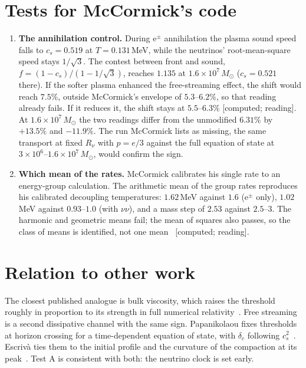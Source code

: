 \documentclass[11pt]{article}
\newcommand{\grade}[1]{\textsf{\small[#1]}}
\begin{document}
\section{Tests for McCormick's code}

\begin{enumerate}
\item \textbf{The annihilation control.} During e$^\pm$ annihilation the plasma sound speed falls to $c_s=0.519$ at $T=0.131$\,MeV, while the neutrinos' root-mean-square speed stays $1/\sqrt3$. The contest between front and sound, $f=(1-c_s)/(1-1/\sqrt3)$, reaches $1.135$ at $1.6\times10^7\,M_\odot$ ($c_s=0.521$ there). If the softer plasma enhanced the free-streaming effect, the shift would reach $7.5\%$, outside McCormick's envelope of $5.3$--$6.2\%$, so that reading already fails. If it reduces it, the shift stays at $5.5$--$6.3\%$ \grade{computed; reading}. At $1.6\times10^7\,M_\odot$ the two readings differ from the unmodified $6.31\%$ by $+13.5\%$ and $-11.9\%$. The run McCormick lists as missing, the same transport at fixed $R_\nu$ with $p=e/3$ against the full equation of state at $3\times10^6$--$1.6\times10^7\,M_\odot$, would confirm the sign.
\item \textbf{Which mean of the rates.} McCormick calibrates his single rate to an energy-group calculation. The arithmetic mean of the group rates reproduces his calibrated decoupling temperatures: $1.62$\,MeV against $1.6$ (e$^\pm$ only), $1.02$\,MeV against $0.93$--$1.0$ (with $\nu\nu$), and a mass step of $2.53$ against $2.5$--$3$. The harmonic and geometric means fail; the mean of squares also passes, so the class of means is identified, not one mean~\cite{WB} \grade{computed; reading}.
\end{enumerate}

\section{Relation to other work}

The closest published analogue is bulk viscosity, which raises the threshold roughly in proportion to its strength in full numerical relativity~\cite{Yuwen}. Free streaming is a second dissipative channel with the same sign. Papanikolaou fixes thresholds at horizon crossing for a time-dependent equation of state, with $\delta_c$ following $c_s^2$~\cite{Pap}. Escriv\`a ties them to the initial profile and the curvature of the compaction at its peak~\cite{Esc}. Test A is consistent with both: the neutrino clock is set early.
\end{document}
